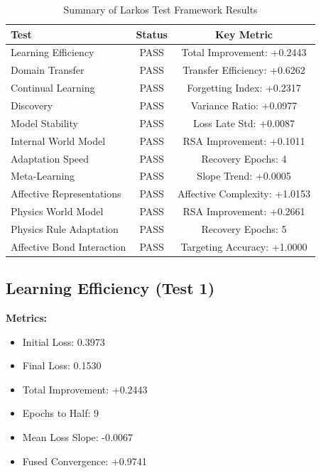 \documentclass[12pt]{article}
\begin{document}
\begin{table}[H]
\centering
\caption{Summary of Larkos Test Framework Results}
\label{tab:tests}
\begin{tabular}{lcc}
\toprule
\textbf{Test} & \textbf{Status} & \textbf{Key Metric} \\
\midrule
Learning Efficiency       & PASS & Total Improvement: +0.2443 \\
Domain Transfer           & PASS & Transfer Efficiency: +0.6262 \\
Continual Learning        & PASS & Forgetting Index: +0.2317 \\
Discovery                 & PASS & Variance Ratio: +0.0977 \\
Model Stability           & PASS & Loss Late Std: +0.0087 \\
Internal World Model      & PASS & RSA Improvement: +0.1011 \\
Adaptation Speed          & PASS & Recovery Epochs: 4 \\
Meta-Learning             & PASS & Slope Trend: +0.0005 \\
Affective Representations & PASS & Affective Complexity: +1.0153 \\
Physics World Model       & PASS & RSA Improvement: +0.2661 \\
Physics Rule Adaptation   & PASS & Recovery Epochs: 5 \\
Affective Bond Interaction& PASS & Targeting Accuracy: +1.0000 \\
\bottomrule
\end{tabular}
\end{table}

\subsection{Learning Efficiency (Test 1)}
\label{subsec:test1}

\textbf{Metrics:}
\begin{itemize}
    \item Initial Loss: 0.3973
    \item Final Loss: 0.1530
    \item Total Improvement: +0.2443
    \item Epochs to Half: 9
    \item Mean Loss Slope: -0.0067
    \item Fused Convergence: +0.9741
\end{itemize}
\end{document}
